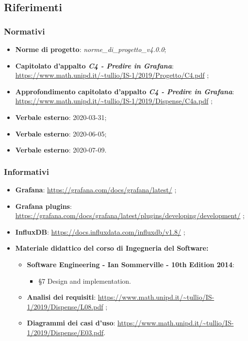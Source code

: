 \subsection{Riferimenti}
		\subsubsection{Normativi}
			\begin{itemize}
				\item \textbf{Norme di progetto}: \emph{norme\_di\_progetto\_v4.0.0};
				\item \textbf{Capitolato d'appalto \emph{C4 - Predire in Grafana}}: \url{https://www.math.unipd.it/~tullio/IS-1/2019/Progetto/C4.pdf} ;
				\item \textbf{Approfondimento capitolato d'appalto \emph{C4 - Predire in Grafana}}: \url{https://www.math.unipd.it/~tullio/IS-1/2019/Dispense/C4a.pdf} ;
				\item \textbf{Verbale esterno}: 2020-03-31;
				\item \textbf{Verbale esterno}: 2020-06-05;
				\item \textbf{Verbale esterno}: 2020-07-09.
			\end{itemize}
		
		\subsubsection{Informativi}
			\begin{itemize}
			\item \textbf{Grafana}: \url{https://grafana.com/docs/grafana/latest/} ;
			\item \textbf{Grafana plugins}: \url{https://grafana.com/docs/grafana/latest/plugins/developing/development/} ;
			\item \textbf{InfluxDB}: \url{https://docs.influxdata.com/influxdb/v1.8/} ;

			\item \textbf{Materiale didattico del corso di Ingegneria del Software:}
			\begin{itemize}
				\item \textbf{Software Engineering - Ian Sommerville - 10th Edition 2014}: \begin{itemize}
				\item \S 7 Design and implementation.
				\end{itemize}
				\item \textbf{Analisi dei requisiti}: \url{https://www.math.unipd.it/~tullio/IS-1/2019/Dispense/L08.pdf} ;				\item \textbf{Diagrammi dei casi d'uso}: \url{https://www.math.unipd.it/~tullio/IS-1/2019/Dispense/E03.pdf}.
					
				\end{itemize}
			\end{itemize}				